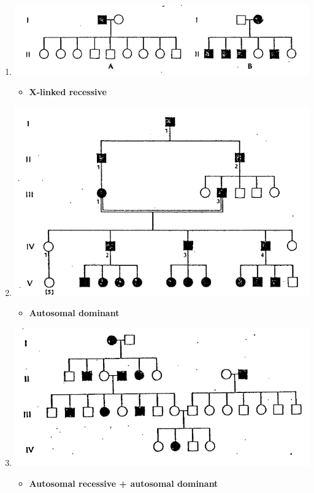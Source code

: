 \documentclass[plain,basic]{inVerba-notes}
\begin{document}
    \begin{enumerate}[label=\textbf{\alph*}.]
        \item \includegraphics[scale=0.4]{images/pedigree-6.png}
            \begin{itemize}
                \item \textbf{X-linked recessive}
            \end{itemize}
        \item \includegraphics[scale=0.4]{images/pedigree-7.png}
            \begin{itemize}
                \item \textbf{Autosomal dominant}
            \end{itemize}
        \item \includegraphics[scale=0.4,angle=-0.5,origin=c]{images/pedigree-8.png}
            \begin{itemize}
                \item \textbf{Autosomal recessive + autosomal dominant}
            \end{itemize}
    \end{enumerate}
\end{document}
